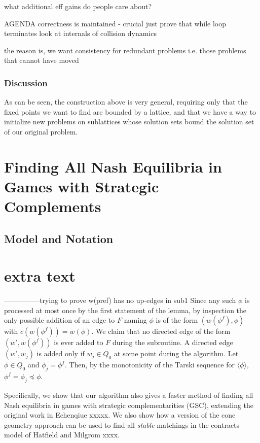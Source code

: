 \documentclass[11pt,reqno]{amsart}
\theoremstyle{definition}
\numberwithin{equation}{section}
\newcommand{\lag}{\langle}
\newcommand{\rag}{\rangle}
\newcommand{\pre}{\phi}
\newcommand{\peq}{\preceq}
\newcommand{\acto}{Q_0}
\newcommand{\forest}{F}
\begin{document}
\begin{enumerate}
what additional eff gains do people care about? 

AGENDA
correctness is maintained - crucial 
just prove that while loop terminates 
look at internals of collision dynamics

the reason is, we want consistency for redundant problems i.e. those problems that cannot have moved 

\subsubsection{Discussion}
As can be seen, the construction above is very general, requiring only that the fixed points we want to find are bounded by a lattice, and that we have a way to initialize new problems on sublattices whose solution sets bound the solution set of our original problem. 

\section{Finding All Nash Equilibria in Games with Strategic Complements}
\subsection{Model and Notation}





\section{extra text} 

---------------trying to prove w(pref) has no up-edges in sub1 
Since any such $\pre$ is processed at most once by the first statement of the lemma, by inspection the only possible addition of an edge to $\forest$ naming $\pre$ is of the form $(w(\pre^f),\pre)$ with $c(w(\pre^f)) = w(\pre)$.  
We claim that no directed edge of the form $(w', w(\pre^f))$ is ever added to $\forest$ during the subroutine. 
A directed edge $(w',w_j)$ is added only if $w_j \in \acto$ at some point during the algorithm. 
Let $\pre \in \acto$ and $\pre_j = \pre^f$. 
Then, by the monotonicity of the Tarski sequence for $\lag \pre \rag$, $\pre^f = \pre_j \peq \pre$.

Specifically, we show that our algorithm also gives a faster method of finding all Nash equilibria in games with strategic complementarities (GSC), extending the original work in Echenqiue xxxxx.  
We also show how a version of the cone geometry approach can be used to find all \emph{stable} matchings in the contracts model of Hatfield and Milgrom xxxx.  


\end{enumerate}
\end{document}
